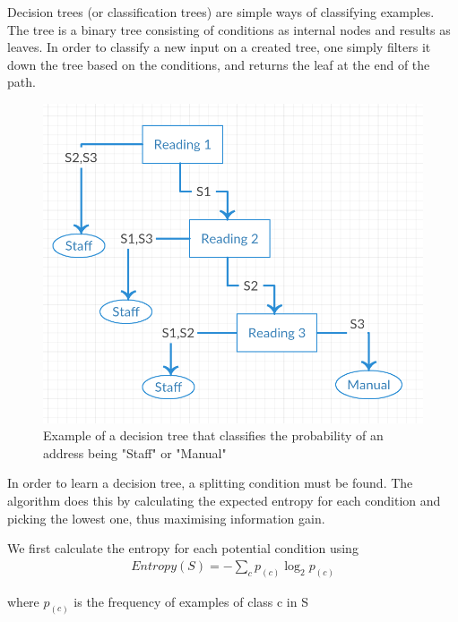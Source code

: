 Decision trees (or classification trees) are simple ways of classifying examples. The tree is a binary tree consisting of conditions as internal nodes and results as leaves. In order to classify a new input on a created tree, one simply filters it down the tree based on the conditions, and returns the leaf at the end of the path.
\begin{figure}[H]
    \centering
    \includegraphics[scale=0.5]{Pictures/dectree.png}
    \caption{Example of a decision tree that classifies the probability of an address being "Staff" or "Manual"}
    \label{fig:dectree}
\end{figure}

In order to learn a decision tree, a splitting condition must be found. The algorithm does this by calculating the expected entropy for each condition and picking the lowest one, thus maximising information gain. \cite{tdndectrees}\\

\par
We first calculate the entropy for each potential condition using
\begin{align*}
	Entropy(S) = -\sum_c p_{(c)} \log_2p_{(c)}
\end{align*}

where $p_{(c)}$ is the frequency of examples of class c in S





